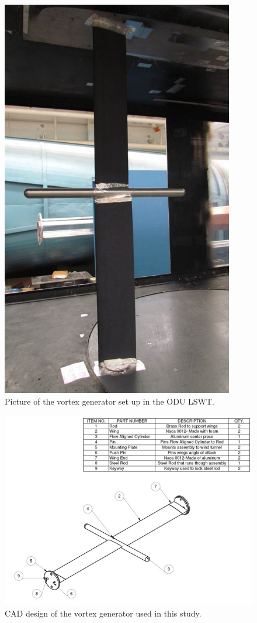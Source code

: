 \begin{figure}[H]
\centering
\includegraphics[width=4in]{figs/setup/vortex_generator/picture}
\caption{Picture of the vortex generator set up in the ODU LSWT.}
\label{fig:vortex_gen}
\end{figure}

\begin{figure}[H]
\centering
\includegraphics[width=6.5in]{figs/setup/vortex_generator/design}
\caption{CAD design of the vortex generator used in this study.}
\label{fig:vortex_design}
\end{figure}

